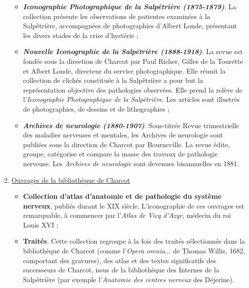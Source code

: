 \begin{enumerate}
\begin{itemize}
\item \textbf{\textit{Iconographie Photographique de la Salpêtrière (1875-1879)}}. La collection présente les observations de patientes examinées à la Salpêtrière, accompagnées de photographies d'Albert Londe, présentant les divers stades de la crise d'hystérie ;
\item \textbf{\textit{Nouvelle Iconographie de la Salpêtrière (1888-1918)}}. La revue est fondée sous la direction de Charcot par Paul Richer, Gilles de la Tourette et Albert Londe, directeur du service photographique. Elle réunit la collection de clichés constituée à la Salpêtrière a pour but la représentation objective des pathologies observées. Elle prend la relève de l'\textit{Iconographie Photographique de la Salpêtrière}. Les articles sont illustrés de photographies, de dessins et de lithographies ;
\item \textbf{\textit{Archives de neurologie (1880-1907)}}. Sous-titrée \og{}Revue trimestrielle des maladies nerveuses et mentales\fg{}, les Archives de neurologie sont publiées sous la direction de Charcot par Bourneville. La revue édite, groupe, catégorise et compare la masse des travaux de pathologie nerveuse. Les \textit{Archives de neurologie} sont devenues bisannuelles en 1881.
\end{itemize}
\item \underline{Ouvrages de la bibliothèque de Charcot}
\begin{itemize}
\item \textbf{Collection d'atlas d'anatomie et de pathologie du système nerveux}, publiés durant le XIX\ieme{} siècle. L'iconographie de ces ouvrages est remarquable, à commencer par l'\textit{Atlas de Vicq d'Azyr}, médecin du roi Louis XVI ;
\item \textbf{Traités}. Cette collection regroupe à la fois des traités sélectionnés dans la bibliothèque de Charcot (comme l'\textit{Opera omnia}$\dots$ de Thomas Willis, 1682, comportant des gravures), des atlas et des textes significatifs des successeurs de Charcot, issus de la bibliothèque des Internes de la Salpêtrière (par exemple l'\textit{Anatomie des centres nerveux} des Déjerine).
\end{itemize}
\end{enumerate}



